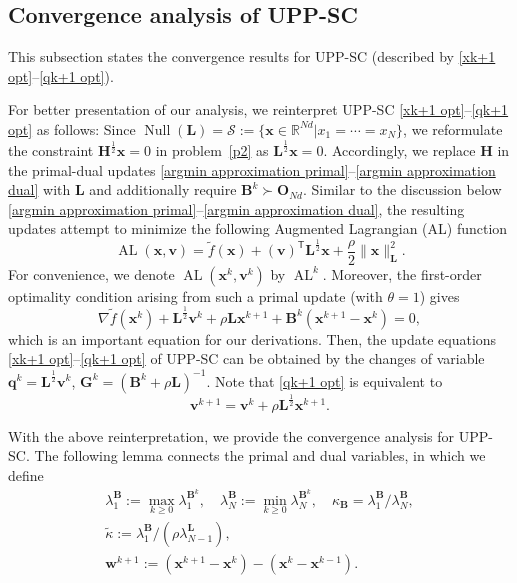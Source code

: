 \documentclass[12pt,draftcls,onecolumn]{IEEEtran}
\renewcommand{\Re}{{\mathbb{R}}}
\newcommand{\bH}{{\mathbf{H}}}
\begin{document}
\subsection{Convergence analysis of UPP-SC}\label{convergence of UPP-SC}

This subsection states the convergence results for UPP-SC (described by \eqref{xk+1 opt}--\eqref{qk+1 opt}).

	For better presentation of our analysis, we reinterpret UPP-SC \eqref{xk+1 opt}--\eqref{qk+1 opt} as follows: Since $\operatorname{Null}(\mathbf{L}) = \mathcal{S} := \{\mathbf{x} \in \Re ^{Nd}|x_1 = \cdots = x_N\}$, we reformulate the constraint $\bH^{\frac{1}{2}}\mathbf{x}=0$ in problem~\eqref{p2} as $\mathbf{L}^{\frac{1}{2}}\mathbf{x}=0$. Accordingly, we replace $\mathbf{H}$ in the primal-dual updates \eqref{argmin approximation primal}--\eqref{argmin approximation dual} with $\mathbf{L}$ and additionally require $\mathbf{B}^k\succ \mathbf{O}_{Nd}$. Similar to the discussion below \eqref{argmin approximation primal}--\eqref{argmin approximation dual}, the resulting updates attempt to minimize the following Augmented Lagrangian (AL) function
	\begin{equation}
		\operatorname{AL}(\mathbf{x},\mathbf{v})=\tilde{f}(\mathbf{x})+(\mathbf{v})^{\mathsf{T}} \mathbf{L}^{\frac{1}{2}}\mathbf{x}+\frac{\rho}{2}\|\mathbf{x}\|^2_\mathbf{L}. \label{AL}
	\end{equation}
	For convenience, we denote $\operatorname{AL}(\mathbf{x}^k,\mathbf{v}^k)$ by $\operatorname{AL}^k$. Moreover, the first-order optimality condition arising from such a primal update (with $\theta=1$) gives
	\begin{equation}
		\label{first-order opt modified} \nabla \tilde{f}(\mathbf{x}^k) + \mathbf{L}^{\frac{1}{2}}\mathbf{v}^k + \rho \mathbf{L} \mathbf{x}^{k+1}+ \mathbf{B}^k(\mathbf{x}^{k+1} - \mathbf{x}^k)=0,
	\end{equation}
	which is an important equation for our derivations. Then, the update equations \eqref{xk+1 opt}--\eqref{qk+1 opt} of UPP-SC can be obtained by the changes of variable $\mathbf{q}^k=\mathbf{L}^{\frac{1}{2}}\mathbf{v}^k$, $\mathbf{G}^k = (\mathbf{B}^k+\rho \mathbf{L})^{-1}$. Note that \eqref{qk+1 opt} is equivalent to 
	\begin{equation}
		\mathbf{v}^{k+1}=\mathbf{v}^k+\rho \mathbf{L}^{\frac{1}{2}}\mathbf{x}^{k+1}. \label{vk+1 opt}
	\end{equation}


With the above reinterpretation, we provide the convergence analysis for UPP-SC. The following lemma connects the primal and dual variables, in which we define 
\begin{gather}
	\label{kappa B} \lambda_1^{\mathbf{B}}:= \max_{k \geq 0} \lambda_1^{\mathbf{B}^k}, \quad \lambda_N^{\mathbf{B}}:= \min_{k \geq 0} \lambda_N^{\mathbf{B}^k}, \quad \kappa_{\mathbf{B}} = {\lambda_1^{\mathbf{B}}}/{\lambda_N^{\mathbf{B}}},\\
	\label{tilde kappa} \tilde{\kappa} := {\lambda_1^{\mathbf{B}}}/({\rho \lambda_{N-1}^{\mathbf{L}}}), \\ 
	\label{wk+1} \mathbf{w}^{k+1} := (\mathbf{x}^{k+1}-\mathbf{x}^{k})-(\mathbf{x}^{k}-\mathbf{x}^{k-1}).
\end{gather}
\end{document}
